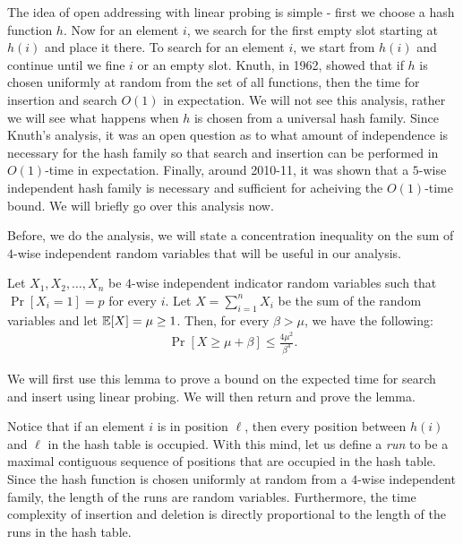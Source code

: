 The idea of open addressing with linear probing is simple - first we choose a
hash function $h$. Now for an element $i$, we search for the first empty slot
starting at $h(i)$ and place it there. To search for an element $i$, we start
from $h(i)$ and continue until we fine $i$ or an empty slot. Knuth, in 1962,
showed that if $h$ is chosen uniformly at random from the set of all functions,
then the time for insertion and search $O(1)$ in expectation. We will not see this analysis, rather we will see what happens when $h$
is chosen from a universal hash family. Since Knuth's analysis, it was an open
question as to what amount of independence is necessary for the hash family so
that search and insertion can be performed in $O(1)$-time in
expectation. Finally, around 2010-11, it was shown that a $5$-wise independent
hash family is necessary and sufficient for acheiving the $O(1)$-time bound. We
will briefly go over this analysis now.

Before, we do the analysis, we will state a concentration inequality on the sum
of $4$-wise independent random variables that will be useful in our analysis.
\begin{lemma}
  Let $X_1, X_2, \ldots, X_n$ be $4$-wise independent indicator random variables
  such that $\Pr[X_i = 1] = p$ for every $i$. Let $X = \sum_{i=1}^n X_i$ be the
  sum of the random variables and let $\mathbb{E}[X] = \mu \geq 1$. Then, for every
  $\beta > \mu$, we have the following:
  \begin{align*}
    \Pr[ X \geq \mu + \beta ] \leq \frac{4\mu^2}{\beta^4}.
  \end{align*}
  \label{lem:conc-4-wise}
\end{lemma}

We will first use this lemma to prove a bound on the expected time for search
and insert using linear probing. We will then return and prove the lemma.

Notice that if an element $i$ is in position $\ell$, then every position between
$h(i)$ and $\ell$ in the hash table is occupied. With this mind, let us define a
\emph{run} to be a maximal contiguous sequence of positions that are occupied in
the hash table. Since the hash function is chosen uniformly at random from a
$4$-wise independent family, the length of the runs are random
variables. Furthermore, the time complexity of insertion and deletion is
directly proportional to the length of the runs in the hash table.

